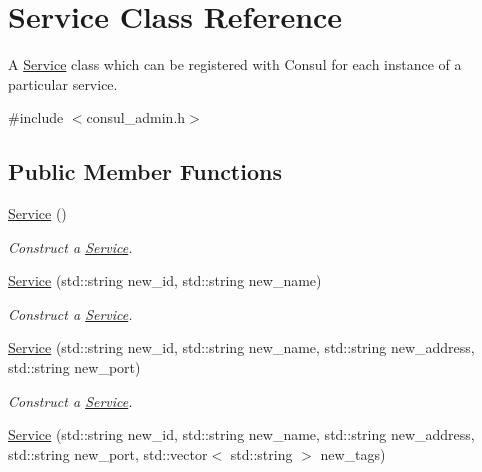 \hypertarget{classService}{\section{Service Class Reference}
\label{classService}
}


A \hyperlink{classService}{Service} class which can be registered with Consul for each instance of a particular service.  




{\ttfamily \#include $<$consul\-\_\-admin.\-h$>$}

\subsection*{Public Member Functions}
\begin{DoxyCompactItemize}
\item 
\hypertarget{classService_acc246c9f7ed3c51e2d91d10fe257513f}{\hyperlink{classService_acc246c9f7ed3c51e2d91d10fe257513f}{Service} ()}\label{classService_acc246c9f7ed3c51e2d91d10fe257513f}

\begin{DoxyCompactList}\small\item\em Construct a \hyperlink{classService}{Service}. \end{DoxyCompactList}\item 
\hypertarget{classService_a5a2c138cda796995fd96f4d72961627e}{\hyperlink{classService_a5a2c138cda796995fd96f4d72961627e}{Service} (std\-::string new\-\_\-id, std\-::string new\-\_\-name)}\label{classService_a5a2c138cda796995fd96f4d72961627e}

\begin{DoxyCompactList}\small\item\em Construct a \hyperlink{classService}{Service}. \end{DoxyCompactList}\item 
\hypertarget{classService_a7fcbb48bac14e340ae490120dff8bc98}{\hyperlink{classService_a7fcbb48bac14e340ae490120dff8bc98}{Service} (std\-::string new\-\_\-id, std\-::string new\-\_\-name, std\-::string new\-\_\-address, std\-::string new\-\_\-port)}\label{classService_a7fcbb48bac14e340ae490120dff8bc98}

\begin{DoxyCompactList}\small\item\em Construct a \hyperlink{classService}{Service}. \end{DoxyCompactList}\item 
\hypertarget{classService_a3f17f6c4a5f8fd51034379e9dcae6d2c}{\hyperlink{classService_a3f17f6c4a5f8fd51034379e9dcae6d2c}{Service} (std\-::string new\-\_\-id, std\-::string new\-\_\-name, std\-::string new\-\_\-address, std\-::string new\-\_\-port, std\-::vector$<$ std\-::string $>$ new\-\_\-tags)}\label{classService_a3f17f6c4a5f8fd51034379e9dcae6d2c}


\end{DoxyCompactItemize}

